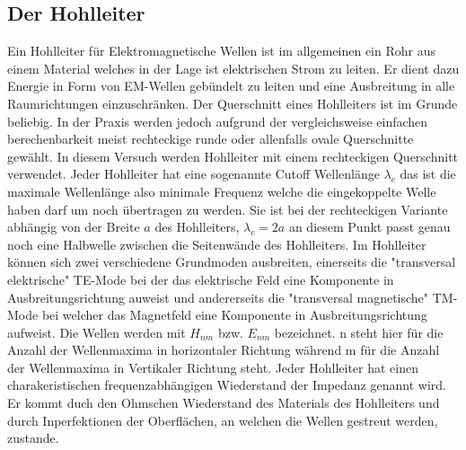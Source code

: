 \subsection{Der Hohlleiter}
\label{sec:thwellenleiter}
Ein Hohlleiter für Elektromagnetische Wellen ist im allgemeinen ein Rohr aus einem Material welches in der 
Lage ist elektrischen Strom zu leiten. Er dient dazu Energie in Form von EM-Wellen gebündelt zu leiten und
eine Ausbreitung in alle Raumrichtungen einzuschränken. Der Querschnitt eines Hohlleiters ist im Grunde 
beliebig. In der Praxis werden jedoch aufgrund der vergleichsweise einfachen berechenbarkeit meist rechteckige
runde oder allenfalls ovale Querschnitte gewählt. In diesem Versuch werden Hohlleiter mit einem rechteckigen
Querschnitt verwendet. Jeder Hohlleiter hat eine sogenannte Cutoff Wellenlänge $\lambda_c$ das ist die maximale
Wellenlänge also minimale Frequenz welche die eingekoppelte Welle haben darf um noch übertragen zu werden.
Sie ist bei der rechteckigen Variante abhängig von der Breite $a$ des Hohlleiters, $\lambda_c=2a$ an diesem Punkt
passt genau noch eine Halbwelle zwischen die Seitenwände des Hohlleiters. Im Hohlleiter können sich zwei verschiedene
Grundmoden ausbreiten, einerseits die "transversal elektrische" TE-Mode bei der das elektrische Feld eine Komponente
in Ausbreitungsrichtung auweist und andererseits die "transversal magnetische" TM-Mode bei welcher das Magnetfeld
eine Komponente in Ausbreitungsrichtung aufweist. Die Wellen werden mit $H_{nm}$ bzw. $E_{nm}$
bezeichnet. n steht hier für die Anzahl der Wellenmaxima in horizontaler Richtung während m für die Anzahl der 
Wellenmaxima in Vertikaler Richtung steht. Jeder Hohlleiter hat einen charakeristischen frequenzabhängigen
Wiederstand der Impedanz genannt wird. Er kommt duch den Ohmschen Wiederstand des Materials des Hohlleiters
und durch Inperfektionen der Oberflächen, an welchen die Wellen gestreut werden, zustande.



